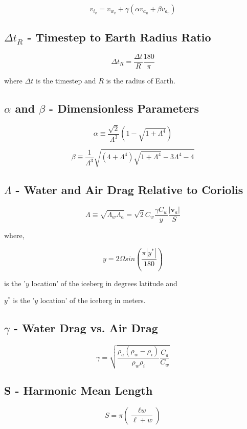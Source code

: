 \documentclass[12pt]{article}
\begin{document}
\begin{equation}
v_{i_v} = v_{w_v} + \gamma(\alpha v_{a_u} + \beta v_{a_v})
\end{equation}

\subsection{$\Delta t_R$ - Timestep to Earth Radius Ratio}

\begin{equation}
\Delta t_R = \dfrac{\Delta t}{R} \dfrac{180}{\pi}
\end{equation}

where $\Delta t$ is the timestep and $R$ is the radius of Earth.

\subsection{$\alpha$ and $\beta$ - Dimensionless Parameters}

\begin{equation}
\alpha \equiv \dfrac{\sqrt{2}}{\Lambda^3}(1-\sqrt{1+\Lambda^4})
\end{equation}

\begin{equation}
\beta \equiv \dfrac{1}{\Lambda^3}\sqrt{(4+\Lambda^4)\sqrt{1+\Lambda^4}
             - 3\Lambda^4 - 4}
\end{equation}

\subsection{$\Lambda$ - Water and Air Drag Relative to Coriolis}

\begin{equation}
\Lambda \equiv \sqrt{\Lambda_w\Lambda_a} = 
\sqrt{2}C_w\dfrac{\gamma C_w}{y}\dfrac{|\textbf{v}_a|}{S}
\end{equation}

where,

\begin{equation}
y = 2 \Omega sin(\dfrac{\pi |y^*|}{180})
\end{equation}

is the '$y$ location' of the iceberg in degrees latitude and 

$y^*$ is the '$y$ location' of the iceberg in meters.

\subsection{$\gamma$ - Water Drag vs. Air Drag}

\begin{equation}
\gamma = \sqrt{\dfrac{\rho_a(\rho_w - \rho_i)}{\rho_w\rho_i}\dfrac{C_a}{C_w}}
\end{equation}

\subsection{S - Harmonic Mean Length}

\begin{equation}
S = \pi(\dfrac{\ell\textit{w}}{\ell+\textit{w}})
\end{equation}
\end{document}
